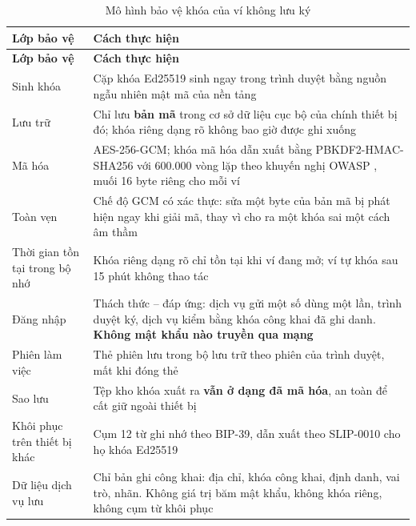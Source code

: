 \begin{longtable}{|p{3.1cm}|p{10.6cm}|}
\caption{Mô hình bảo vệ khóa của ví không lưu ký}
\label{tab:wallet-security} \\

\hline
\textbf{Lớp bảo vệ} & \textbf{Cách thực hiện} \\
\hline
\endfirsthead

\hline
\textbf{Lớp bảo vệ} & \textbf{Cách thực hiện} \\
\hline
\endhead

\hline
\endfoot

\hline
\endlastfoot

Sinh khóa
& Cặp khóa Ed25519 sinh ngay trong trình duyệt bằng nguồn ngẫu nhiên mật mã của nền tảng \\
\hline

Lưu trữ
& Chỉ lưu \textbf{bản mã} trong cơ sở dữ liệu cục bộ của chính thiết bị đó; khóa riêng dạng rõ không bao giờ được ghi xuống \\
\hline

Mã hóa
& AES-256-GCM; khóa mã hóa dẫn xuất bằng PBKDF2-HMAC-SHA256 với 600.000 vòng lặp theo khuyến nghị OWASP \cite{OWASP_PasswordStorage}, muối 16 byte riêng cho mỗi ví \\
\hline

Toàn vẹn
& Chế độ GCM có xác thực: sửa một byte của bản mã bị phát hiện ngay khi giải mã, thay vì cho ra một khóa sai một cách âm thầm \\
\hline

Thời gian tồn tại trong bộ nhớ
& Khóa riêng dạng rõ chỉ tồn tại khi ví đang mở; ví tự khóa sau 15 phút không thao tác \\
\hline

Đăng nhập
& Thách thức -- đáp ứng: dịch vụ gửi một số dùng một lần, trình duyệt ký, dịch vụ kiểm bằng khóa công khai đã ghi danh. \textbf{Không mật khẩu nào truyền qua mạng} \\
\hline

Phiên làm việc
& Thẻ phiên lưu trong bộ lưu trữ theo phiên của trình duyệt, mất khi đóng thẻ \\
\hline

Sao lưu
& Tệp kho khóa xuất ra \textbf{vẫn ở dạng đã mã hóa}, an toàn để cất giữ ngoài thiết bị \\
\hline

Khôi phục trên thiết bị khác
& Cụm 12 từ ghi nhớ theo BIP-39, dẫn xuất theo SLIP-0010 cho họ khóa Ed25519 \\
\hline

Dữ liệu dịch vụ lưu
& Chỉ bản ghi công khai: địa chỉ, khóa công khai, định danh, vai trò, nhãn. Không giá trị băm mật khẩu, không khóa riêng, không cụm từ khôi phục \\
\hline

\end{longtable}
